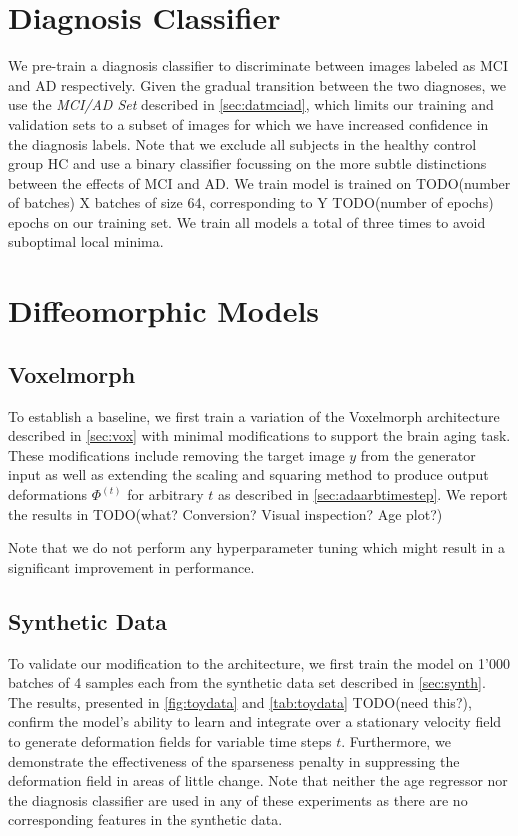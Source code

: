 \section{Diagnosis Classifier}
We pre-train a diagnosis classifier to discriminate between images labeled as MCI and AD respectively. Given the gradual transition between the two diagnoses, we use the \textit{MCI/AD Set} described in \autoref{sec:datmciad}, which limits our training and validation sets to a subset of images for which we have increased confidence in the diagnosis labels. Note that we exclude all subjects in the healthy control group HC and use a binary classifier focussing on the more subtle distinctions between the effects of MCI and AD. We train model is trained on TODO(number of batches) X batches of size 64, corresponding to Y TODO(number of epochs) epochs on our training set. We train all models a total of three times to avoid suboptimal local minima.

\section{Diffeomorphic Models}

\subsection{Voxelmorph}
To establish a baseline, we first train a variation of the Voxelmorph architecture described in \autoref{sec:vox} with minimal modifications to support the brain aging task. These modifications include removing the target image $y$ from the generator input as well as extending the scaling and squaring method to produce output deformations $\Phi^{(t)}$ for arbitrary $t$ as described in \autoref{sec:adaarbtimestep}. We report the results in TODO(what? Conversion? Visual inspection? Age plot?)

Note that we do not perform any hyperparameter tuning which might result in a significant improvement in performance.

\subsection{Synthetic Data}
To validate our modification to the architecture, we first train the model on 1'000 batches of 4 samples each from the synthetic data set described in \autoref{sec:synth}. The results, presented in \autoref{fig:toydata} and \autoref{tab:toydata} TODO(need this?), confirm the model's ability to learn and integrate over a stationary velocity field to generate deformation fields for variable time steps $t$. Furthermore, we demonstrate the effectiveness of the sparseness penalty in suppressing the deformation field in areas of little change. Note that neither the age regressor nor the diagnosis classifier are used in any of these experiments as there are no corresponding features in the synthetic data.

